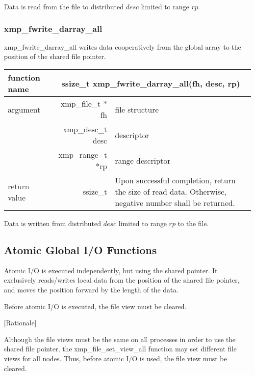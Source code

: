    Data is read from the file to distributed $desc$ limited to range $rp$.

   \subsubsection{xmp\_fwrite\_darray\_all}
   xmp\_fwrite\_darray\_all writes data cooperatively from the global array to the
   position of the shared file pointer.

   \begin{table}[h]
    \begin{center}
     \begin{tabular}{|l|r|p{80mm}|}
      \hline
      {\bf function name}  & \multicolumn{2}{c|}{\bf ssize\_t
      xmp\_fwrite\_darray\_all(fh, desc, rp)} \\ \hline \hline
      argument & xmp\_file\_t $*$fh & file structure \\ \cline{2-3}
      & xmp\_desc\_t desc & descriptor \\ \cline{2-3}
      & xmp\_range\_t $*$rp & range descriptor \\ \hline
      return value & ssize\_t & Upon successful completion, return the size
	      of read data. Otherwise, negative number shall be
	      returned. \\ \hline
      \end{tabular}
     \end{center}
   \end{table}

   Data is written from distributed $desc$ limited to range $rp$ to the file.


   \subsection{Atomic Global I/O Functions}

   Atomic I/O is executed independently, but using the shared pointer. 
   It exclusively reads/writes local data
   from the position of the shared file pointer, and moves the position
   forward by the length of the data.

   Before atomic I/O is executed, the file view must be cleared.
   
   [Rationale]

   Although the file views must be the same on all processes in order to
   use the shared file pointer, the xmp\_file\_set\_view\_all
   function may set different file views for all nodes.
   Thus, before atomic I/O is used, the file view must be cleared.

